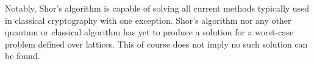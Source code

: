 Notably, Shor's algorithm is capable of solving all current methods typically used in classical cryptography with one exception. Shor's algorithm nor any other quantum or classical algorithm has yet to produce a solution for a worst-case problem defined over lattices. This of course does not imply no such solution can be found. 

